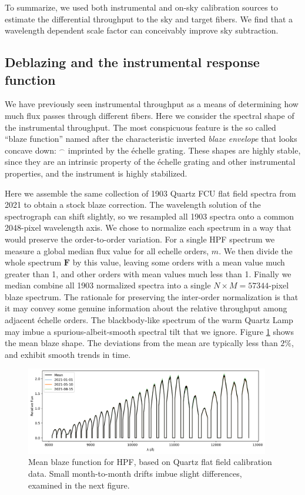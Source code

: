 \documentclass[modern]{aastex631}
\begin{document}
To summarize, we used both instrumental and on-sky calibration sources to estimate the differential throughput to the sky and target fibers.  We find that a wavelength dependent scale factor can conceivably improve sky subtraction.  

\subsection{Deblazing and the instrumental response function}

We have previously seen instrumental throughput as a means of determining how much flux passes through different fibers.  Here we consider the spectral shape of the instrumental throughput.  The most conspicuous feature is the so called ``blaze function'' named after the characteristic inverted \emph{blaze envelope} that looks concave down: $^\frown$ imprinted by the \'echelle grating.  These shapes are highly stable, since they are an intrinsic property of the \'echelle grating and other instrumental properties, and the instrument is highly stabilized.

Here we assemble the same collection of 1903 Quartz FCU flat field spectra from 2021 to obtain a stock blaze correction.  The wavelength solution of the spectrograph can shift slightly, so we resampled all 1903 spectra onto a common 2048-pixel wavelength axis. We chose to normalize each spectrum in a way that would preserve the order-to-order variation.  For a single HPF spectrum we measure a global median flux value for all echelle orders, $m$.  We then divide the whole spectrum $\mathbf{F}$ by this value, leaving some orders with a mean value much greater than 1, and other orders with mean values much less than 1.  Finally we median combine all 1903 normalized spectra into a single $N\times M=57344$-pixel blaze spectrum.  The rationale for preserving the inter-order normalization is that it may convey some genuine information about the relative throughput among adjacent \'echelle orders.  The blackbody-like spectrum of the warm Quartz Lamp may imbue a spurious-albeit-smooth spectral tilt that we ignore.  Figure \ref{fig:blaze} shows the mean blaze shape.  The deviations from the mean are typically less than $2\%$, and exhibit smooth trends in time.  

\begin{figure}[ht]
  \centering
  \includegraphics[width=0.95\textwidth]{figures/HPF_mean_blaze_function.png}
\caption{Mean blaze function for HPF, based on Quartz flat field calibration data.  Small month-to-month drifts imbue slight differences, examined in the next figure.}
\label{fig:blaze}
\end{figure}
\end{document}
